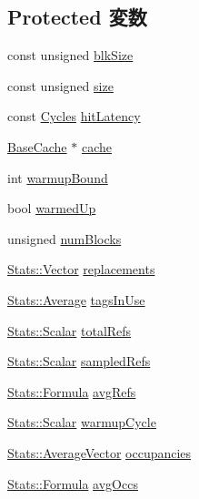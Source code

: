\subsection*{Protected 変数}
\begin{DoxyCompactItemize}
\item 
const unsigned \hyperlink{classBaseTags_a87b03496724866a3daf3e8ebeb831290}{blkSize}
\item 
const unsigned \hyperlink{classBaseTags_ad3f1cf0299fe68eb9a68a7c67232c62d}{size}
\item 
const \hyperlink{classCycles}{Cycles} \hyperlink{classBaseTags_a4075fdc5720f8f0f57c379c396e74718}{hitLatency}
\item 
\hyperlink{classBaseCache}{BaseCache} $\ast$ \hyperlink{classBaseTags_a5cc08dee7231c774489c04728dd5f169}{cache}
\item 
int \hyperlink{classBaseTags_a34cba5da4dbcf8dec784f2ebf3bcb431}{warmupBound}
\item 
bool \hyperlink{classBaseTags_a63243e2a441445feb3cf7a36fbaf4673}{warmedUp}
\item 
unsigned \hyperlink{classBaseTags_af2c745d276c1a795177201764016234c}{numBlocks}
\item 
\hyperlink{classStats_1_1Vector}{Stats::Vector} \hyperlink{group__CacheStatistics_gabe49d967160cb4f2808c2374eada5cbd}{replacements}
\item 
\hyperlink{classStats_1_1Average}{Stats::Average} \hyperlink{group__CacheStatistics_gac47f8631e7a5c6ca2d7bdc4a3385ef5c}{tagsInUse}
\item 
\hyperlink{classStats_1_1Scalar}{Stats::Scalar} \hyperlink{group__CacheStatistics_gaafe04ce7df5e42da3c45e3991561520e}{totalRefs}
\item 
\hyperlink{classStats_1_1Scalar}{Stats::Scalar} \hyperlink{group__CacheStatistics_ga0b8c102a0e9d83ec69d9ac7ee25b378b}{sampledRefs}
\item 
\hyperlink{classStats_1_1Formula}{Stats::Formula} \hyperlink{group__CacheStatistics_gadbcb32891448d652807958d7d79cac39}{avgRefs}
\item 
\hyperlink{classStats_1_1Scalar}{Stats::Scalar} \hyperlink{group__CacheStatistics_ga2607cf0f839148422c1a78a9e21e2c29}{warmupCycle}
\item 
\hyperlink{classStats_1_1AverageVector}{Stats::AverageVector} \hyperlink{group__CacheStatistics_ga5626c7c93bb670e27e205ceba0240361}{occupancies}
\item 
\hyperlink{classStats_1_1Formula}{Stats::Formula} \hyperlink{group__CacheStatistics_ga9e42737de532cd164b91f1217862d1ce}{avgOccs}

\end{DoxyCompactItemize}
